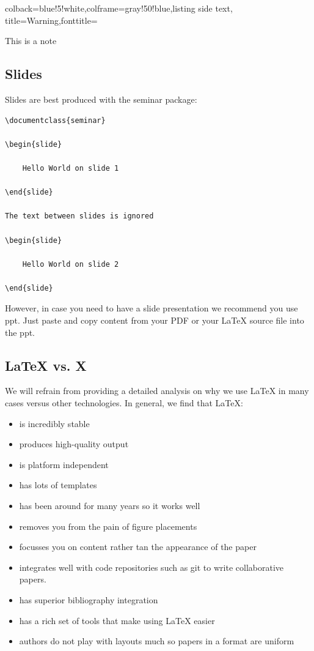 \begin{tcblisting}{colback=blue!5!white,colframe=gray!50!blue,listing side text,  title=Warning,fonttitle=\bfseries}
\begin{WARNING}
This is a note
\end{WARNING}
\end{tcblisting}


\subsection{Slides}\label{slides}

Slides are best produced with the seminar package:

\begin{verbatim}
\documentclass{seminar}

\begin{slide}

    Hello World on slide 1

\end{slide}

The text between slides is ignored

\begin{slide}

    Hello World on slide 2

\end{slide}
\end{verbatim}

However, in case you need to have a slide presentation we recommend you
use ppt. Just paste and copy content from your PDF or your LaTeX source
file into the ppt.



\subsection{LaTeX vs. X}\label{latex-vs.-x}

We will refrain from providing a detailed analysis on why we use LaTeX
in many cases versus other technologies. In general, we find that LaTeX:

\begin{itemize}

\item
  is incredibly stable
\item
  produces high-quality output
\item
  is platform independent
\item
  has lots of templates
\item
  has been around for many years so it works well
\item
  removes you from the pain of figure placements
\item
  focusses you on content rather tan the appearance of the paper
\item
  integrates well with code repositories such as git to write
  collaborative papers.
\item
  has superior bibliography integration
\item
  has a rich set of tools that make using LaTeX easier
\item
  authors do not play with layouts much so papers in a format are
  uniform
\end{itemize}

